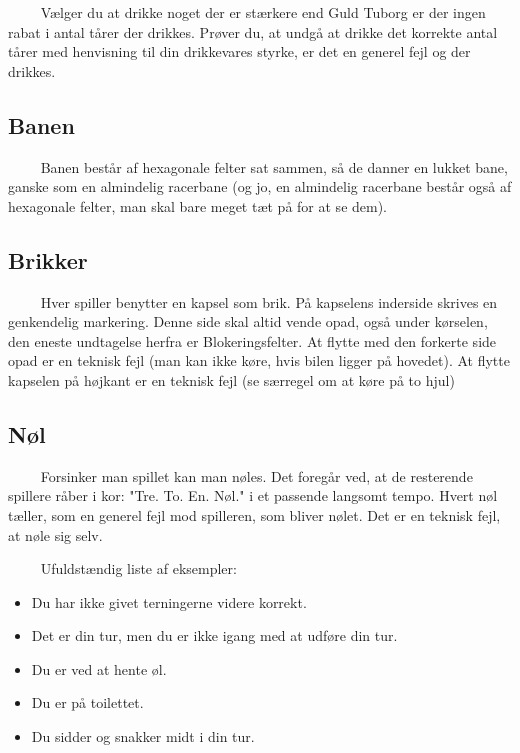 \documentclass[12pt]{article}
\begin{document}
$\qquad$ Vælger du at drikke noget der er stærkere end Guld Tuborg er der ingen rabat i antal tårer der drikkes. Prøver du, at undgå at drikke det korrekte antal tårer med henvisning til din drikkevares styrke, er det en generel fejl og der drikkes.


\subsection*{Banen}

$\qquad$ Banen består af hexagonale felter sat sammen, så de danner en lukket bane, ganske som en almindelig racerbane (og jo, en almindelig racerbane består også af hexagonale felter, man skal bare meget tæt på for at se dem).


\subsection*{Brikker}

$\qquad$ Hver spiller benytter en kapsel som brik. På kapselens inderside skrives en genkendelig markering. Denne side skal altid vende opad, også under kørselen, den eneste undtagelse herfra er Blokeringsfelter. At flytte med den forkerte side opad er en teknisk fejl (man kan ikke køre, hvis bilen ligger på hovedet). At flytte kapselen på højkant er en teknisk fejl (se særregel om at køre på to hjul)


\subsection*{Nøl}

$\qquad$ Forsinker man spillet kan man nøles. Det foregår ved, at de resterende spillere råber i kor: "Tre. To. En. Nøl." i et passende langsomt tempo. Hvert nøl tæller, som en generel fejl mod spilleren, som bliver nølet. Det er en teknisk fejl, at nøle sig selv.

$\qquad$ Ufuldstændig liste af eksempler:

\begin{itemize}
	\item Du har ikke givet terningerne videre korrekt.
	\item Det er din tur, men du er ikke igang med at udføre din tur.
	\item Du er ved at hente øl.
	\item Du er på toilettet.
	\item Du sidder og snakker midt i din tur.
\end{itemize}
\end{document}

